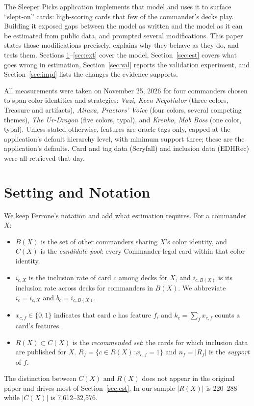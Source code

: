 \documentclass[11pt]{article}
\theoremstyle{remark}
\begin{document}
The Sleeper Picks application implements that model and uses it to surface
``slept-on'' cards: high-scoring cards that few of the commander's decks play.
Building it exposed gaps between the model as written and the model as it can be
estimated from public data, and prompted several modifications. This paper
states those modifications precisely, explains why they behave as they do, and
tests them. Sections \ref{sec:setting}--\ref{sec:ext} cover the model,
Section~\ref{sec:est} covers what goes wrong in estimation, Section~\ref{sec:val}
reports the validation experiment, and Section~\ref{sec:impl} lists the changes
the evidence supports.

All measurements were taken on November 25, 2026 for four commanders chosen to
span color identities and strategies: \emph{Vazi, Keen Negotiator} (three colors,
Treasure and artifacts), \emph{Atraxa, Praetors' Voice} (four colors, several
competing themes), \emph{The Ur-Dragon} (five colors, typal), and \emph{Krenko,
Mob Boss} (one color, typal). Unless stated otherwise, features are oracle tags
only, capped at the application's default hierarchy level, with minimum support
three; these are the application's defaults. Card and tag data (Scryfall) and
inclusion data (EDHRec) were all retrieved that day.

\section{Setting and Notation}\label{sec:setting}
\noindent We keep Ferrone's notation and add what estimation requires. For a
commander $X$:
\begin{itemize}
  \item $B(X)$ is the set of other commanders sharing $X$'s color identity, and
        $C(X)$ is the \emph{candidate pool}: every Commander-legal card within
        that color identity.
  \item $i_{c,X}$ is the inclusion rate of card $c$ among decks for $X$, and
        $i_{c,B(X)}$ is its inclusion rate across decks for commanders in $B(X)$.
        We abbreviate $i_c = i_{c,X}$ and $b_c = i_{c,B(X)}$.
  \item $x_{c,f}\in\{0,1\}$ indicates that card $c$ has feature $f$, and
        $k_c=\sum_f x_{c,f}$ counts a card's features.
  \item $R(X)\subset C(X)$ is the \emph{recommended set}: the cards for which
        inclusion data are published for $X$. $R_f=\{c\in R(X): x_{c,f}=1\}$ and
        $n_f=|R_f|$ is the \emph{support} of $f$.
\end{itemize}
The distinction between $C(X)$ and $R(X)$ does not appear in the original paper
and drives most of Section~\ref{sec:est}. In our sample $|R(X)|$ is 220--288
while $|C(X)|$ is 7{,}612--32{,}576.
\end{document}
